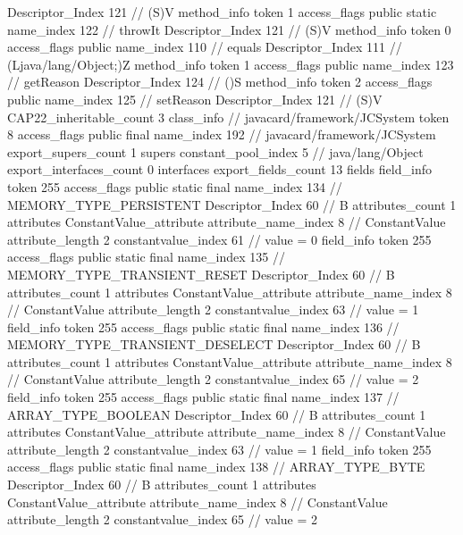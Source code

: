 {{{{{					Descriptor_Index	121		// (S)V
				}
				method_info {
					token	1
					access_flags	public static
					name_index	122		// throwIt
					Descriptor_Index	121		// (S)V
				}
				method_info {
					token	0
					access_flags	public
					name_index	110		// equals
					Descriptor_Index	111		// (Ljava/lang/Object;)Z
				}
				method_info {
					token	1
					access_flags	public
					name_index	123		// getReason
					Descriptor_Index	124		// ()S
				}
				method_info {
					token	2
					access_flags	public
					name_index	125		// setReason
					Descriptor_Index	121		// (S)V
				}
			}
			CAP22_inheritable_count	3
		}
		class_info {		// javacard/framework/JCSystem
			token	8
			access_flags	public final
			name_index	192		// javacard/framework/JCSystem
			export_supers_count	1
			supers {
				constant_pool_index	5		// java/lang/Object
			}
			export_interfaces_count	0
			interfaces {
			}
			export_fields_count	13
			fields {
			field_info {
				token	255
				access_flags	public static final
				name_index	134		// MEMORY_TYPE_PERSISTENT
				Descriptor_Index	60		// B
				attributes_count	1
				attributes {
				ConstantValue_attribute {
					attribute_name_index	8		// ConstantValue
					attribute_length	2
					constantvalue_index	61		// value = 0
				}
				}
			}
			field_info {
				token	255
				access_flags	public static final
				name_index	135		// MEMORY_TYPE_TRANSIENT_RESET
				Descriptor_Index	60		// B
				attributes_count	1
				attributes {
				ConstantValue_attribute {
					attribute_name_index	8		// ConstantValue
					attribute_length	2
					constantvalue_index	63		// value = 1
				}
				}
			}
			field_info {
				token	255
				access_flags	public static final
				name_index	136		// MEMORY_TYPE_TRANSIENT_DESELECT
				Descriptor_Index	60		// B
				attributes_count	1
				attributes {
				ConstantValue_attribute {
					attribute_name_index	8		// ConstantValue
					attribute_length	2
					constantvalue_index	65		// value = 2
				}
				}
			}
			field_info {
				token	255
				access_flags	public static final
				name_index	137		// ARRAY_TYPE_BOOLEAN
				Descriptor_Index	60		// B
				attributes_count	1
				attributes {
				ConstantValue_attribute {
					attribute_name_index	8		// ConstantValue
					attribute_length	2
					constantvalue_index	63		// value = 1
				}
				}
			}
			field_info {
				token	255
				access_flags	public static final
				name_index	138		// ARRAY_TYPE_BYTE
				Descriptor_Index	60		// B
				attributes_count	1
				attributes {
				ConstantValue_attribute {
					attribute_name_index	8		// ConstantValue
					attribute_length	2
					constantvalue_index	65		// value = 2
}}}}}}}
